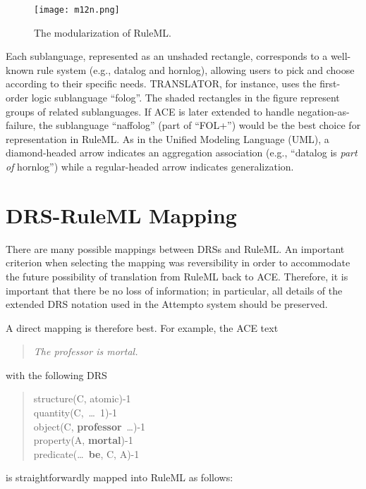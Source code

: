 \documentclass[12pt]{report}
\begin{document}
\begin{figure}[!htbp]
	\begin{center}
		\texttt{[image: m12n.png]}
	\caption{The modularization of RuleML.}
	\label{fig:m12n}
	\end{center}
\end{figure}

Each sublanguage, represented as an unshaded rectangle, corresponds to a well-known rule system (e.g., datalog and hornlog), allowing users to pick and choose according to their specific needs. TRANSLATOR, for instance, uses the first-order logic sublanguage ``folog''. The shaded rectangles in the figure represent groups of related sublanguages. If ACE is later extended to handle negation-as-failure, the sublanguage ``naffolog'' (part of ``FOL+'') would be the best choice for representation in RuleML. As in the Unified Modeling Language (UML), a diamond-headed arrow indicates an aggregation association (e.g., ``datalog is \textit{part of} hornlog'') while a regular-headed arrow indicates generalization.

\section{DRS-RuleML Mapping}

There are many possible mappings between DRSs and RuleML. An important criterion when selecting the mapping was reversibility in order to accommodate the future possibility of translation from RuleML back to ACE. Therefore, it is important that there be no loss of information; in particular, all details of the extended DRS notation used in the Attempto system should be preserved.

A direct mapping is therefore best. For example, the ACE text
\begin{quote}
\textit{The professor is mortal.}
\end{quote}
with the following DRS
\begin{quote}
{
 structure(C, atomic)-1\\
 quantity(C,~\ldots~1)-1\\
 object(C, \textbf{professor}~\ldots)-1\\
 property(A, \textbf{mortal})-1\\
 predicate(\ldots~\textbf{be}, C, A)-1
}
\end{quote}
is straightforwardly mapped into RuleML as follows:

\newcommand{\dave}[1]
{\rmfamily\normalsize\emph{\textbf{#1}}\ttfamily\small}
\end{document}
